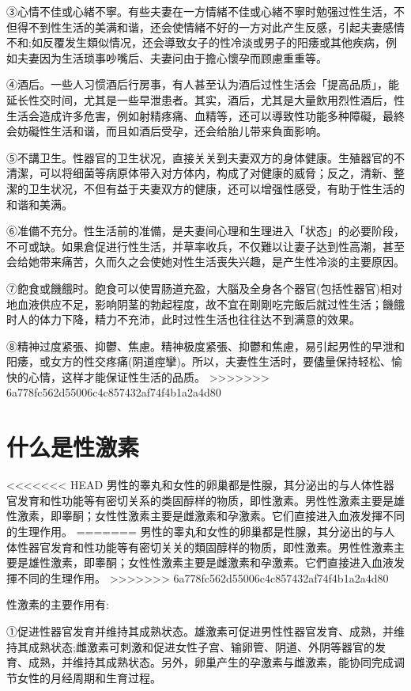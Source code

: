 \documentclass[12pt,UTF8]{ctexbook}
\begin{document}
③心情不佳或心緒不寧。有些夫妻在一方情緒不佳或心緒不寧时勉强过性生活，不但得不到性生活的美满和谐，还会使情緒不好的一方对此产生反感，引起夫妻感情不和;如反覆发生類似情况，还会導致女子的性冷淡或男子的阳痿或其他疾病，例如夫妻因为生活琐事吵嘴后、夫妻问由于擔心懷孕而顾慮重重等。

④酒后。一些人习惯酒后行房事，有人甚至认为酒后过性生活会「提高品质」，能延长性交时间，尤其是一些早泄患者。其实，酒后，尤其是大量飲用烈性酒后，性生活会造成许多危害，例如射精疼痛、血精等，还可以導致性功能多种障礙，最終会妨礙性生活和谐，而且如酒后受孕，还会给胎儿带来負面影响。

⑤不講卫生。性器官的卫生状况，直接关关到夫妻双方的身体健康。生殖器官的不清潔，可以将细菌等病原体带入对方体内，构成了对健康的威脅；反之，清新、整潔的卫生状况，不但有益于夫妻双方的健康，还可以增强性感受，有助于性生活的和谐和美满。

⑥准備不充分。性生活前的准備，是夫妻间心理和生理进入「状态」的必要阶段，不可或缺。如果倉促进行性生活，并草率收兵，不仅難以让妻子达到性高潮，甚至会给她带来痛苦，久而久之会使她对性生活喪失兴趣，是产生性冷淡的主要原因。

⑦飽食或饑餓时。飽食可以使胃肠道充盈，大腦及全身各个器官(包括性器官)相对地血液供应不足，影响阴茎的勃起程度，故不宜在剛剛吃完飯后就过性生活；饑餓时人的体力下降，精力不充沛，此时过性生活也往往达不到满意的效果。

⑧精神过度紧張、抑鬱、焦慮。精神极度紧張、抑鬱和焦慮，易引起男性的早泄和阳痿，或女方的性交疼痛(阴道痙攣)。所以，夫妻性生活时，要儘量保持轻松、愉快的心情，这样才能保证性生活的品质。
>>>>>>> 6a778fc562d55006c4c857432af74f4b1a2a4d80

\section{什么是性激素}

<<<<<<< HEAD
男性的睾丸和女性的卵巢都是性腺，其分泌出的与人体性器官发育和性功能等有密切关系的类固醇样的物质，即性激素。男性性激素主要是雄性激素，即睾酮；女性性激素主要是雌激素和孕激素。它们直接进入血液发揮不同的生理作用。
=======
男性的睾丸和女性的卵巢都是性腺，其分泌出的与人体性器官发育和性功能等有密切关关的類固醇样的物质，即性激素。男性性激素主要是雄性激素，即睾酮；女性性激素主要是雌激素和孕激素。它們直接进入血液发揮不同的生理作用。
>>>>>>> 6a778fc562d55006c4c857432af74f4b1a2a4d80

性激素的主要作用有:

①促进性器官发育并维持其成熟状态。雄激素可促进男性性器官发育、成熟，并维持其成熟状态;雌激素可刺激和促进女性子宫、输卵管、阴道、外阴等器官的发育、成熟，并维持其成熟状态。另外，卵巢产生的孕激素与雌激素，能协同完成调节女性的月经周期和生育过程。
\end{document}
